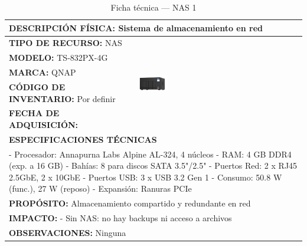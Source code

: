 \begin{table}[H]
\centering
\scriptsize
\setlength{\tabcolsep}{2pt}
\renewcommand{\arraystretch}{1.0}
\caption{Ficha técnica --- NAS 1}\label{tab:nas-1}
\begin{tabular}{|p{}|p{}|}
\hline
\multicolumn{2}{|l|}{\textbf{DESCRIPCIÓN FÍSICA:} Sistema de almacenamiento en red} \\ \hline
\textbf{TIPO DE RECURSO:} NAS & 
\multirow{5}{*}{\includegraphics[width=0.18\textwidth,keepaspectratio]{tablas-images/cp1/NAS/nas-1.png}} \\ \cline{1-1}
\textbf{MODELO:} TS-832PX-4G & \\ \cline{1-1}
\textbf{MARCA:} QNAP & \\ \cline{1-1}
\textbf{CÓDIGO DE INVENTARIO:} Por definir & \\ \cline{1-1}
\textbf{FECHA DE ADQUISICIÓN:} & \\ \hline
\multicolumn{2}{|l|}{\textbf{ESPECIFICACIONES TÉCNICAS}} \\ \hline
\multicolumn{2}{|p{0.7\textwidth}|}{
- Procesador: Annapurna Labs Alpine AL-324, 4 núcleos
- RAM: 4 GB DDR4 (exp. a 16 GB)
- Bahías: 8 para discos SATA 3.5"/2.5"
- Puertos Red: 2 x RJ45 2.5GbE, 2 x 10GbE
- Puertos USB: 3 x USB 3.2 Gen 1
- Consumo: 50.8 W (func.), 27 W (reposo)
- Expansión: Ranuras PCIe
} \\ \hline
\multicolumn{2}{|p{0.7\textwidth}|}{\textbf{PROPÓSITO:} Almacenamiento compartido y redundante en red} \\ \hline
\multicolumn{2}{|p{0.7\textwidth}|}{\textbf{IMPACTO:} - Sin NAS: no hay backups ni acceso a archivos} \\ \hline
\multicolumn{2}{|p{0.7\textwidth}|}{\textbf{OBSERVACIONES:} Ninguna} \\ \hline
\end{tabular}
\end{table}

